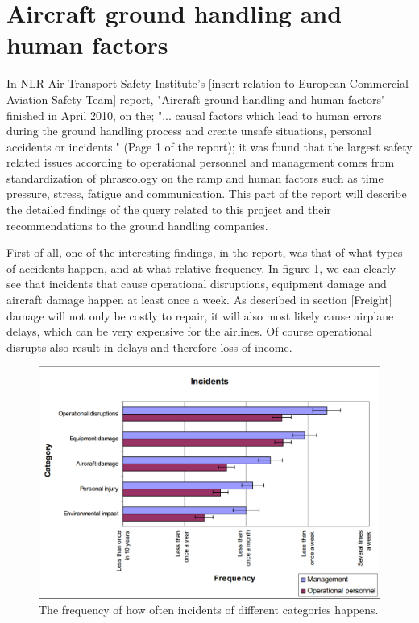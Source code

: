 \section{Aircraft ground handling and human factors}
In NLR Air Transport Safety Institute's [insert relation to European Commercial Aviation Safety Team] report, "Aircraft ground handling and human factors" finished in April 2010, on the; "... causal factors which lead to human errors during the ground handling process and create unsafe situations, personal accidents or incidents." (Page 1 of the report); it was found that the largest safety related issues according to operational personnel and management comes from standardization of phraseology on the ramp and human factors such as time pressure, stress, fatigue and communication. This part of the report will describe the detailed findings of the query related to this project and their recommendations to the ground handling companies.

First of all, one of the interesting findings, in the report, was that of what types of accidents happen, and at what relative frequency. In figure \ref{FrequencyOfIncidents}, we can clearly see that incidents that cause operational disruptions, equipment damage and aircraft damage happen at least once a week. As described in section [Freight] damage will not only be costly to repair, it will also most likely cause airplane delays, which can be very expensive for the airlines. Of course operational disrupts also result in delays and therefore loss of income.

\begin{figure}[!h]
\centering
\includegraphics[width=\textwidth]{Grafik/FrequencyOfIncidents}
\caption{The frequency of how often incidents of different categories happens.}
\label{FrequencyOfIncidents}
\end{figure}

